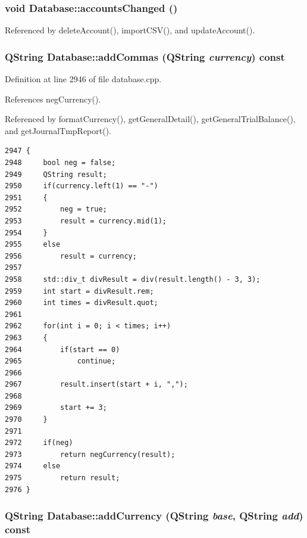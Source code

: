 \hypertarget{classDatabase_l0}{
\subsubsection[accountsChanged]{\setlength{\rightskip}{0pt plus 5cm}void Database::accounts\-Changed ()}}
\label{classDatabase_l0}




Referenced by delete\-Account(), import\-CSV(), and update\-Account().\hypertarget{classDatabase_a48}{
\subsubsection[addCommas]{\setlength{\rightskip}{0pt plus 5cm}QString Database::add\-Commas (QString {\em currency}) const}}
\label{classDatabase_a48}


Definition at line 2946 of file database.cpp.

References neg\-Currency().

Referenced by format\-Currency(), get\-General\-Detail(), get\-General\-Trial\-Balance(), and get\-Journal\-Tmp\-Report().

\footnotesize\begin{verbatim}2947 {
2948     bool neg = false;
2949     QString result;
2950     if(currency.left(1) == "-")
2951     {
2952         neg = true;
2953         result = currency.mid(1);
2954     }
2955     else
2956         result = currency;
2957 
2958     std::div_t divResult = div(result.length() - 3, 3);
2959     int start = divResult.rem;
2960     int times = divResult.quot;
2961 
2962     for(int i = 0; i < times; i++)
2963     {
2964         if(start == 0)
2965             continue;
2966 
2967         result.insert(start + i, ",");
2968 
2969         start += 3;
2970     }
2971 
2972     if(neg)
2973         return negCurrency(result);
2974     else
2975         return result;
2976 }
\end{verbatim}\normalsize 


\hypertarget{classDatabase_a46}{
\subsubsection[addCurrency]{\setlength{\rightskip}{0pt plus 5cm}QString Database::add\-Currency (QString {\em base}, QString {\em add}) const}}
\label{classDatabase_a46}



